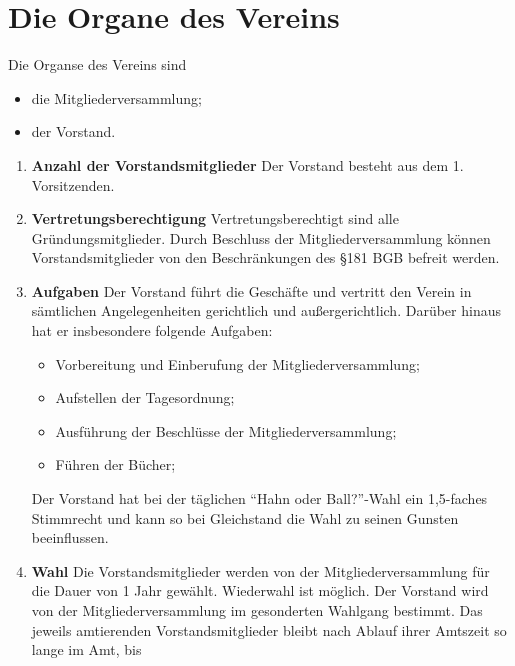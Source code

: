 \documentclass{scrartcl}
\begin{document}
    \section{Die Organe des Vereins}
        Die Organse des Vereins sind
        \begin{itemize}
            \item die Mitgliederversammlung;
            \item der Vorstand.
        \end{itemize}
        \begin{enumerate}
            \item \textbf{Anzahl der Vorstandsmitglieder} \newline
                Der Vorstand besteht aus dem 1. Vorsitzenden.
            \item \textbf{Vertretungsberechtigung} \newline
                Vertretungsberechtigt sind alle Gründungsmitglieder. 
                Durch Beschluss der Mitgliederversammlung können Vorstandsmitglieder von den Beschränkungen des \S 181 BGB befreit werden.
            \item \textbf{Aufgaben} \newline
                Der Vorstand führt die Geschäfte und vertritt den Verein in sämtlichen Angelegenheiten
                gerichtlich und außergerichtlich. Darüber hinaus hat er insbesondere folgende Aufgaben:
                \begin{itemize}
                    \item Vorbereitung und Einberufung der Mitgliederversammlung;
                    \item Aufstellen der Tagesordnung;
                    \item Ausführung der Beschlüsse der Mitgliederversammlung;
                    \item Führen der Bücher;
                \end{itemize}
                Der Vorstand hat bei der täglichen ``Hahn oder Ball?''-Wahl ein 1,5-faches Stimmrecht und kann so bei Gleichstand die Wahl zu seinen Gunsten beeinflussen.
            \item \textbf{Wahl} \newline
                Die Vorstandsmitglieder werden von der Mitgliederversammlung für die Dauer von 1 Jahr
                gewählt. Wiederwahl ist möglich. Der Vorstand wird von der
                Mitgliederversammlung im gesonderten Wahlgang bestimmt. 
                Das jeweils amtierenden Vorstandsmitglieder bleibt nach Ablauf ihrer Amtszeit so lange im Amt, bis

\end{enumerate}
\end{document}
